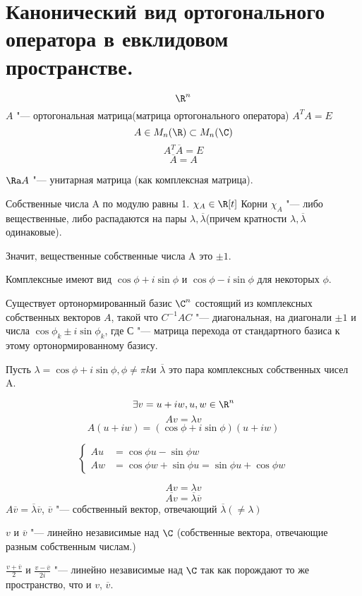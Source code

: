 ﻿\section{Канонический вид ортогонального оператора в евклидовом пространстве.}

$$\R^n$$
$A$ "--- ортогональная матрица(матрица ортогонального оператора) $A^TA = E$
$$A \in M_n(\R) \subset M_n(\C)$$
$$A^{T}\overline{A} = E$$
$$\overline{A} = A$$

$\Ra A$ "--- унитарная матрица (как комплексная матрица).

Собственные числа A по модулю равны 1. 
$\chi_A \in \R[t]$
Корни $\chi_A$ "--- либо вещественные, либо
распадаются на пары $\lambda, \overline{\lambda}$(причем кратности $\lambda, \overline{\lambda}$ одинаковые).

Значит, вещественные собственные числа A это $\pm 1$.

Комплексные имеют вид $\cos \phi + i \sin \phi$ и $\cos \phi - i \sin \phi$ для некоторых $\phi$.

Существует ортонормированный базис $\C^n$ состоящий из комплексных
собственных векторов $A$, такой что
$C^{-1}AC$ "--- диагональная, на диагонали $\pm 1$ и числа $\cos \phi_k \pm i \sin \phi_k$, где
С "--- матрица перехода от стандартного базиса к этому ортонормированному базису.

Пусть $\lambda = \cos \phi + i \sin \phi, \phi \ne \pi k$и $\overline{\lambda}$ 
это пара комплексных собственных чисел A.

$$\exists v = u + iw, u, w\in \R^n$$
$$Av = \lambda v$$
$$A(u + iw) = (\cos \phi + i \sin \phi)(u + iw)$$


$$\left\{
\begin{aligned}
Au &= \cos \phi u - \sin \phi w \\
Aw &= \cos \phi w + \sin \phi u =  \sin \phi u + \cos \phi w
\end{aligned}
\right.$$


$$Av = \lambda v$$
$$\overline{Av} = \overline{\lambda} \overline{v}$$
$A \overline{v} = \overline{\lambda} \overline{v}$, $\overline{v}$ "--- собственный вектор, отвечающий $\overline{\lambda}(\ne \lambda)$

$v$ и $\overline{v}$ "--- линейно независимые над $\C$ (собственные вектора, отвечающие разным собственным числам.) 

$\frac{v + \overline{v}}{2}$ и $\frac{v - \overline{v}}{2i}$ "--- линейно независимые над $\C$ так как порождают то же пространство, что и $v$, $\overline{v}$.

